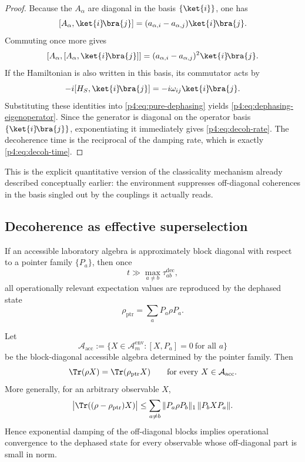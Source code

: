\documentclass[12pt,a4paper]{article}
\begin{document}
\begin{proof}
Because the \(A_\alpha\) are diagonal in the basis \(\{\ket{i}\}\), one has
\[
[A_\alpha,\ket{i}\!\bra{j}]
=
(a_{\alpha,i}-a_{\alpha,j})\ket{i}\!\bra{j}.
\]
Commuting once more gives
\[
[A_\alpha,[A_\alpha,\ket{i}\!\bra{j}]]
=
(a_{\alpha,i}-a_{\alpha,j})^2\ket{i}\!\bra{j}.
\]
If the Hamiltonian is also written in this basis, its commutator acts by
\[
-i[H_S,\ket{i}\!\bra{j}]=-i\omega_{ij}\ket{i}\!\bra{j}.
\]
Substituting these identities into \eqref{p4:eq:pure-dephasing} yields \eqref{p4:eq:dephasing-eigenoperator}.
Since the generator is diagonal on the operator basis \(\{\ket{i}\!\bra{j}\}\), exponentiating it immediately gives \eqref{p4:eq:decoh-rate}.
The decoherence time is the reciprocal of the damping rate, which is exactly \eqref{p4:eq:decoh-time}.
\end{proof}

This is the explicit quantitative version of the classicality mechanism already described conceptually earlier: the environment suppresses off-diagonal coherences in the basis singled out by the couplings it actually reads.



\subsection{Decoherence as effective superselection}
\label{p4:sec:part3-einselection}

If an accessible laboratory algebra is approximately block diagonal with respect to a pointer family $\{P_a\}$, then once
\begin{equation}
\label{p4:eq:decoh-separation}
t \gg \max_{a\neq b}\tau_{ab}^{\mathrm{dec}},
\end{equation}
all operationally relevant expectation values are reproduced by the dephased state
\begin{equation}
\label{p4:eq:dephased-state}
\rho_{\mathrm{ptr}} = \sum_a P_a\rho P_a.
\end{equation}


\begin{corollary}
\label{p4:cor:pointer-operational}
Let
\[
\mathcal A_{\mathrm{acc}}
:=
\{X\in\mathcal A_m^{\mathrm{env}}:[X,P_a]=0\ \text{for all }a\}
\]
be the block-diagonal accessible algebra determined by the pointer family.
Then
\begin{equation}
\label{p4:eq:pointer-operational-exact}
\Tr(\rho X)=\Tr(\rho_{\mathrm{ptr}}X)
\qquad
\text{for every }X\in\mathcal A_{\mathrm{acc}}.
\end{equation}
More generally, for an arbitrary observable \(X\),
\begin{equation}
\label{p4:eq:pointer-operational-bound}
\bigl|\Tr((\rho-\rho_{\mathrm{ptr}})X)\bigr|
\le
\sum_{a\neq b}\|P_a\rho P_b\|_1\,\|P_b X P_a\|.
\end{equation}
Hence exponential damping of the off-diagonal blocks implies operational convergence to the dephased state for every observable whose off-diagonal part is small in norm.
\end{corollary}
\end{document}
